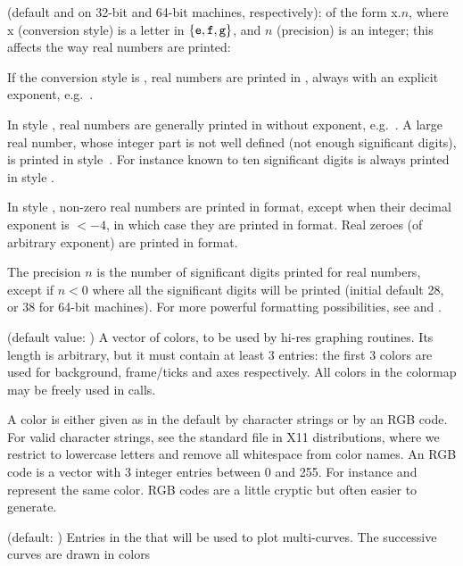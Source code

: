 (default  and  on 32-bit and
64-bit machines, respectively): of the form x$.n$, where x (conversion style)
is a letter in $\{{\tt e},{\tt f},{\tt g}\}$, and $n$ (precision) is an
integer; this affects the way real numbers are printed:
\label{se:format}

\item If the conversion style is , real numbers are printed in
, always with an explicit exponent,
e.g.~.

\item In style , real numbers are generally printed in  without exponent, e.g.~. A large
real number, whose integer part is not well defined (not enough significant
digits), is printed in style~. For instance  known to
ten significant digits is always printed in style .

\item In style , non-zero real numbers are printed in  format,
except when their decimal exponent is $< -4$, in which case they are printed in
 format. Real zeroes (of arbitrary exponent) are printed in 
format.

The precision $n$ is the number of significant digits printed for real
numbers, except if $n<0$ where all the significant digits will be printed
(initial default 28, or 38 for 64-bit machines). For more powerful formatting
possibilities, see  and .

 (default value: ) A vector of colors, to be
used by hi-res graphing routines. Its length is arbitrary, but it must
contain at least 3 entries: the first 3 colors are used for background,
frame/ticks and axes respectively. All colors in the colormap may be freely
used in  calls.

A color is either given as in the default by character strings or by an RGB
code. For valid character strings, see the standard  file in X11
distributions, where we restrict to lowercase letters and remove all
whitespace from color names. An RGB code is a vector with 3 integer entries
between 0 and 255. For instance \kbd{[250, 235, 215]} and  represent the same color. RGB codes are a little cryptic but often
easier to generate.

 (default: \kbd{[4,5]}) Entries in the
 that will be used to plot multi-curves. The successive
curves are drawn in colors

